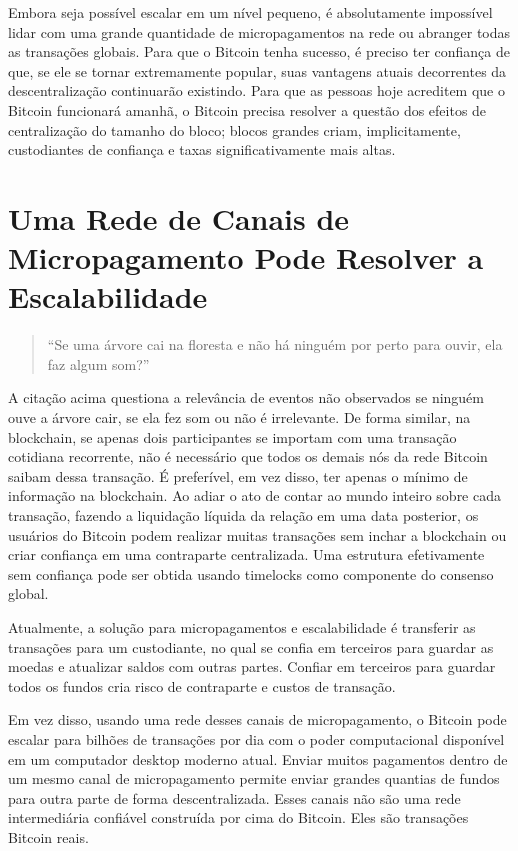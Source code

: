\documentclass[letterpaper,11pt]{article}
\begin{document}
Embora seja possível escalar em um nível pequeno, é absolutamente impossível
lidar com uma grande quantidade de micropagamentos na rede ou abranger todas as
transações globais. Para que o Bitcoin tenha sucesso, é preciso ter confiança
de que, se ele se tornar extremamente popular, suas vantagens atuais decorrentes
da descentralização continuarão existindo. Para que as pessoas hoje acreditem
que o Bitcoin funcionará amanhã, o Bitcoin precisa resolver a questão dos
efeitos de centralização do tamanho do bloco; blocos grandes criam,
implicitamente, custodiantes de confiança e taxas significativamente mais
altas.

\section{Uma Rede de Canais de Micropagamento Pode Resolver a Escalabilidade}

\begin{quote}
	``Se uma árvore cai na floresta e não há ninguém por perto para ouvir,
	ela faz algum som?''
\end{quote}

A citação acima questiona a relevância de eventos não observados \textemdash se
ninguém ouve a árvore cair, se ela fez som ou não é irrelevante. De forma
similar, na blockchain, se apenas dois participantes se importam com uma
transação cotidiana recorrente, não é necessário que todos os demais nós da rede
Bitcoin saibam dessa transação. É preferível, em vez disso, ter apenas o mínimo
de informação na blockchain. Ao adiar o ato de contar ao mundo inteiro sobre
cada transação, fazendo a liquidação líquida da relação em uma data posterior,
os usuários do Bitcoin podem realizar muitas transações sem inchar a blockchain
ou criar confiança em uma contraparte centralizada. Uma estrutura efetivamente
sem confiança pode ser obtida usando timelocks como componente do consenso
global.

Atualmente, a solução para micropagamentos e escalabilidade é transferir as
transações para um custodiante, no qual se confia em terceiros para guardar as
moedas e atualizar saldos com outras partes. Confiar em terceiros para guardar
todos os fundos cria risco de contraparte e custos de transação.

Em vez disso, usando uma rede desses canais de micropagamento, o Bitcoin pode
escalar para bilhões de transações por dia com o poder computacional disponível
em um computador desktop moderno atual. Enviar muitos pagamentos dentro de um
mesmo canal de micropagamento permite enviar grandes quantias de fundos para
outra parte de forma descentralizada. Esses canais não são uma rede
intermediária confiável construída por cima do Bitcoin. Eles são transações
Bitcoin reais.
\end{document}
